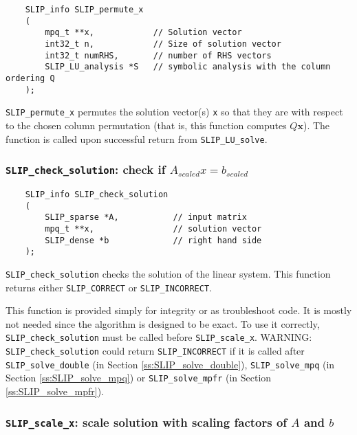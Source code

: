 \documentclass[12pt]{article}
\theoremstyle{definition}
\begin{document}
\begin{mdframed}[userdefinedwidth=6in]
{\footnotesize
\begin{verbatim}
    SLIP_info SLIP_permute_x
    (
        mpq_t **x,            // Solution vector
        int32_t n,            // Size of solution vector
        int32_t numRHS,       // number of RHS vectors
        SLIP_LU_analysis *S   // symbolic analysis with the column ordering Q
    );
\end{verbatim}
} \end{mdframed}


\verb|SLIP_permute_x| permutes the solution vector(s) \verb|x| so that they are
with respect to the chosen column permutation (that is, this function computes
$Q \mathbf{x}$). The function is called upon successful return from
\verb|SLIP_LU_solve|.

\cprotect\subsubsection{\verb|SLIP_check_solution|: check if $A_{scaled}x=b_{scaled}$}

\begin{mdframed}[userdefinedwidth=6in]
{\footnotesize
\begin{verbatim}
    SLIP_info SLIP_check_solution
    (
        SLIP_sparse *A,           // input matrix
        mpq_t **x,                // solution vector
        SLIP_dense *b             // right hand side
    );
\end{verbatim}
} \end{mdframed}

\verb|SLIP_check_solution| checks the solution of the linear system. This
function returns either \verb|SLIP_CORRECT| or \verb|SLIP_INCORRECT|.

This function is provided simply for integrity or as troubleshoot code. It is
mostly not needed since the algorithm is designed to be exact. To use it
correctly, \verb|SLIP_check_solution| must be called before
\verb|SLIP_scale_x|. WARNING: \verb|SLIP_check_solution| could return
\verb|SLIP_INCORRECT| if it is called after \verb|SLIP_solve_double| (in
Section \ref{ss:SLIP_solve_double}), \verb|SLIP_solve_mpq| (in Section
\ref{ss:SLIP_solve_mpq}) or \verb|SLIP_solve_mpfr| (in Section
\ref{ss:SLIP_solve_mpfr}).


\cprotect\subsubsection{\verb|SLIP_scale_x|: scale solution with scaling factors of $A$ and $b$}
\label{ss:SLIP_scale_x}
\end{document}
